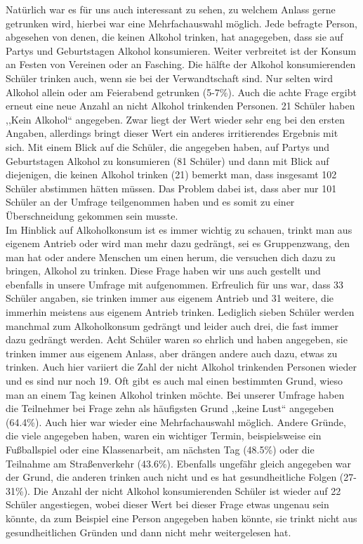 \documentclass[12pt]{article}
\begin{document}
Natürlich war es für uns auch interessant zu sehen, zu welchem Anlass gerne getrunken wird, hierbei war eine Mehrfachauswahl möglich. Jede befragte Person, abgesehen von denen, die keinen Alkohol trinken, hat anagegeben, dass sie auf Partys und Geburtstagen Alkohol konsumieren. Weiter verbreitet ist der Konsum an Festen von Vereinen oder an Fasching. Die hälfte der Alkohol konsumierenden Schüler trinken auch, wenn sie bei der Verwandtschaft sind. Nur selten wird Alkohol allein oder am Feierabend getrunken (5-7\%). Auch die achte Frage ergibt erneut eine neue Anzahl an nicht Alkohol trinkenden Personen. 21 Schüler haben ,,Kein Alkohol“ angegeben. Zwar liegt der Wert wieder sehr eng bei den ersten Angaben, allerdings bringt dieser Wert ein anderes irritierendes Ergebnis mit sich. Mit einem Blick auf die Schüler, die angegeben haben, auf Partys und Geburtstagen Alkohol zu konsumieren (81 Schüler) und dann mit Blick auf diejenigen, die keinen Alkohol trinken (21) bemerkt man, dass insgesamt 102 Schüler abstimmen hätten müssen. Das Problem dabei ist, dass aber nur 101 Schüler an der Umfrage teilgenommen haben und es somit zu einer Überschneidung gekommen sein musste.\\ 
Im Hinblick auf Alkoholkonsum ist es immer wichtig zu schauen, trinkt man aus eigenem Antrieb oder wird man mehr dazu gedrängt, sei es Gruppenzwang, den man hat oder andere Menschen um einen herum, die versuchen dich dazu zu bringen, Alkohol zu trinken. Diese Frage haben wir uns auch gestellt und ebenfalls in unsere Umfrage mit aufgenommen. Erfreulich für uns war, dass 33 Schüler angaben, sie trinken immer aus eigenem Antrieb und 31 weitere, die immerhin meistens aus eigenem Antrieb trinken. Lediglich sieben Schüler werden manchmal zum Alkoholkonsum gedrängt und leider auch drei, die fast immer dazu gedrängt werden. Acht Schüler waren so ehrlich und haben angegeben, sie trinken immer aus eigenem Anlass, aber drängen andere auch dazu, etwas zu trinken. Auch hier variiert die Zahl der nicht Alkohol trinkenden Personen wieder und es sind nur noch 19.
Oft gibt es auch mal einen bestimmten Grund, wieso man an einem Tag keinen Alkohol trinken möchte. Bei unserer Umfrage haben die Teilnehmer bei Frage zehn als häufigsten Grund ,,keine Lust“ angegeben (64.4\%). Auch hier war wieder eine Mehrfachauswahl möglich. Andere Gründe, die viele angegeben haben, waren ein wichtiger Termin, beispielsweise ein Fußballspiel oder eine Klassenarbeit, am nächsten Tag (48.5\%) oder die Teilnahme am Straßenverkehr (43.6\%). Ebenfalls ungefähr gleich angegeben war der Grund, die anderen trinken auch nicht und es hat gesundheitliche Folgen (27-31\%). Die Anzahl der nicht Alkohol konsumierenden Schüler ist wieder auf 22 Schüler angestiegen, wobei dieser Wert bei dieser Frage etwas ungenau sein könnte, da zum Beispiel eine Person angegeben haben könnte, sie trinkt nicht aus gesundheitlichen Gründen und dann nicht mehr weitergelesen hat. \\
\end{document}
